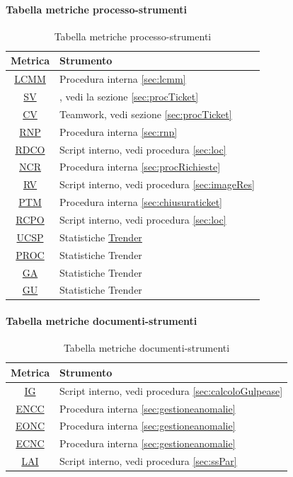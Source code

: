 		\paragraph{Tabella metriche processo-strumenti}
		\begin{table}[H]
			\centering
			\label{tab:metriceProcStrumenti}
			\begin{tabular}{cl}
				\toprule
				Metrica & Strumento \\
				\hline
				\hyperref[LCMM]{LCMM}    &  Procedura interna \ref{sec:lcmm} \\
				\hyperref[SV]{SV}      & \glo{Teamwork}{Teamwork}, vedi la sezione \ref{sec:procTicket}  \\
				\hyperref[CV]{CV}      & Teamwork, vedi sezione \ref{sec:procTicket}\\
				\hyperref[RNP]{RNP}     & Procedura interna \ref{sec:rnp} \\
				\hyperref[RDCO]{RDCO}    & Script interno, vedi procedura \ref{sec:loc} \\
				\hyperref[NCR]{NCR}     & Procedura interna \ref{sec:procRichieste} \\ 
				\hyperref[RV]{RV}      & Script interno, vedi procedura \ref{sec:imageRes} \\
				\hyperref[PTM]{PTM}     & Procedura interna \ref{sec:chiusuraticket}          \\
				\hyperref[RCPO]{RCPO}    & Script interno, vedi procedura \ref{sec:loc} \\ 
				\hyperref[UCSP]{UCSP}    & Statistiche \hyperref[sec:trender]{Trender} \\
				\hyperref[PROC]{PROC}    & Statistiche Trender \\
				\hyperref[GA]{GA} 		& Statistiche Trender \\
				\hyperref[GU]{GU}      & Statistiche Trender \\
				\bottomrule    
			\end{tabular}
			\caption{Tabella metriche processo-strumenti}
		\end{table}
		\paragraph{Tabella metriche documenti-strumenti}
		\begin{table}[H]
			\centering
			\label{tab:metriceDocStrumenti}
			\begin{tabular}{cl}
				\toprule
				Metrica & Strumento \\
				\hline
				\hyperref[IG]{IG}    &  Script interno, vedi procedura \ref{sec:calcoloGulpease} \\
				\hyperref[ENNC]{ENCC} & Procedura interna \ref{sec:gestioneanomalie} \\
				\hyperref[EONC]{EONC} & Procedura interna \ref{sec:gestioneanomalie} \\
				\hyperref[ECNC]{ECNC} & Procedura interna \ref{sec:gestioneanomalie} \\
				\hyperref[LAI]{LAI} & Script interno, vedi procedura \ref{sec:ssPar} \\
				\bottomrule    
			\end{tabular}
			\caption{Tabella metriche documenti-strumenti}
		\end{table}
